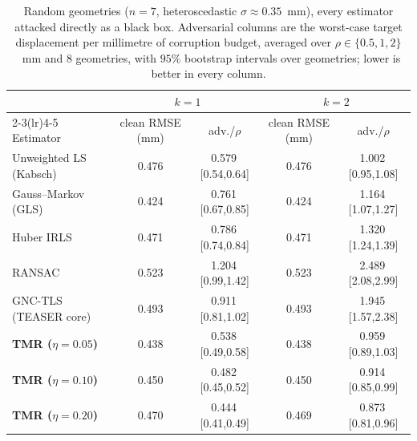 \begin{table}[t]
\centering\footnotesize
\caption{Random geometries ($n=7$, heteroscedastic $\sigma \approx 0.35$~mm), every estimator attacked directly as a black box. Adversarial columns are the worst-case target displacement per millimetre of corruption budget, averaged over $\rho\in\{0.5,1,2\}$~mm and 8 geometries, with $95\%$ bootstrap intervals over geometries; lower is better in every column.}
\label{tab:main}
\begin{tabular}{@{}lcccc@{}}
\toprule
& \multicolumn{2}{c}{$k=1$} & \multicolumn{2}{c}{$k=2$} \\
\cmidrule(lr){2-3}\cmidrule(lr){4-5}
Estimator & clean RMSE (mm) & adv./$\rho$ & clean RMSE (mm) & adv./$\rho$ \\
\midrule
Unweighted LS (Kabsch) & 0.476 & 0.579\,{\tiny[0.54,0.64]} & 0.476 & 1.002\,{\tiny[0.95,1.08]} \\
Gauss--Markov (GLS) & 0.424 & 0.761\,{\tiny[0.67,0.85]} & 0.424 & 1.164\,{\tiny[1.07,1.27]} \\
Huber IRLS & 0.471 & 0.786\,{\tiny[0.74,0.84]} & 0.471 & 1.320\,{\tiny[1.24,1.39]} \\
RANSAC & 0.523 & 1.204\,{\tiny[0.99,1.42]} & 0.523 & 2.489\,{\tiny[2.08,2.99]} \\
GNC-TLS (TEASER core) & 0.493 & 0.911\,{\tiny[0.81,1.02]} & 0.493 & 1.945\,{\tiny[1.57,2.38]} \\
\midrule
\textbf{TMR ($\eta=0.05$)} & 0.438 & 0.538\,{\tiny[0.49,0.58]} & 0.438 & 0.959\,{\tiny[0.89,1.03]} \\
\textbf{TMR ($\eta=0.10$)} & 0.450 & 0.482\,{\tiny[0.45,0.52]} & 0.450 & 0.914\,{\tiny[0.85,0.99]} \\
\textbf{TMR ($\eta=0.20$)} & 0.470 & 0.444\,{\tiny[0.41,0.49]} & 0.469 & 0.873\,{\tiny[0.81,0.96]} \\
\bottomrule
\end{tabular}
\end{table}
